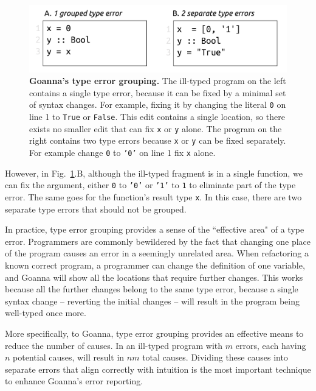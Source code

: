 \documentclass[pdflatex,sn-mathphys-num]{sn-jnl}%
\begin{document}
   \begin{figure}[ht!]
        \centering
        \includegraphics[width=0.8\linewidth]{images/Grouping-Example}
        \caption[Goanna's type error grouping]{\textbf{Goanna's type error grouping.} The ill-typed program on the left contains a single type error, because it can be fixed by a minimal set of syntax changes. For example, fixing it by changing the literal \texttt{0} on line 1 to \texttt{True} or \texttt{False}. This edit contains a single location, so there exists no smaller edit that can fix \texttt{x} or \texttt{y} alone. The program on the right contains two type errors because \texttt{x} or \texttt{y} can be fixed separately. For example change \texttt{0} to \texttt{'0'} on line 1 fix \texttt{x} alone. }
        \label{fig:grouping-example}
    \end{figure}



    However, in Fig.~\ref{fig:grouping-example}.B, although the ill-typed fragment is in a single function, we can fix the argument, either \texttt{0} to \texttt{'0'} or \texttt{'1'} to \texttt{1} to eliminate part of the type error. The same goes for the function's result type \texttt{x}. In this case, there are two separate type errors that should not be grouped.

	In practice, type error grouping provides a sense of the ``effective area" of a type error. Programmers are commonly bewildered by the fact that changing one place of the program causes an error in a seemingly unrelated area. When refactoring a known correct program, a programmer can change the definition of one variable, and Goanna will show all the locations that require further changes. This works because all the further changes belong to the same type error, because a single syntax change -- reverting the initial changes -- will result in the program being well-typed once more.
	
	More specifically, to Goanna, type error grouping provides an effective means to reduce the number of causes. In an ill-typed program with $m$ errors, each having $n$ potential causes, will result in $nm$ total causes. Dividing these causes into separate errors that align correctly with intuition is the most important technique to enhance Goanna's error reporting.
\end{document}
